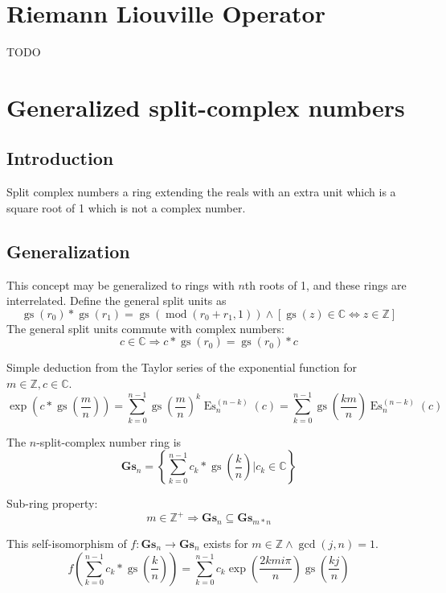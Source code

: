\documentclass[]{article}
\DeclareMathOperator{\es}{Es}
\DeclareMathOperator{\gs}{gs}
\DeclareMathOperator{\md}{mod}
\newcommand{\pqty}[1]{{\left(#1\right)}}
\newcommand{\Bqty}[1]{{\left\{#1\right\}}}
\newcommand{\bqty}[1]{{\left[#1\right]}}
\numberwithin{equation}{section}
\begin{document}
	\section{Riemann Liouville Operator}
	TODO
	
	\section{Generalized split-complex numbers}
	\subsection{Introduction}
	Split complex numbers a ring extending the reals with an extra unit which is a square root of 1 which is not a complex number.
	\subsection{Generalization}
	This concept may be generalized to rings with $n$th roots of 1, and these rings are interrelated. Define the general split units as
	\begin{equation}
	\gs\pqty{r_0}*\gs\pqty{r_1}=\gs\pqty{\md\pqty{r_0+r_1,1}}
	\land
	\bqty{\gs\pqty{z}\in\mathbb{C}\Leftrightarrow z\in\mathbb{Z}}
	\end{equation}
	The general split units commute with complex numbers:
	\begin{equation}
	c\in\mathbb{C}\Rightarrow c*\gs\pqty{r_0}=\gs\pqty{r_0}*c
	\end{equation}
	
	Simple deduction from the Taylor series of the exponential function for $m\in\mathbb{Z}, c\in\mathbb{C}$.
	\begin{equation}
	\exp\pqty{c*\gs\pqty{\frac{m}{n}}}=\sum_{k=0}^{n-1}\gs\pqty{\frac{m}{n}}^k \es_n^{(n-k)}\pqty{c}
	=\sum_{k=0}^{n-1}\gs\pqty{\frac{km}{n}} \es_n^{(n-k)}\pqty{c}
	\end{equation}
	
	The $n$-split-complex number ring is
	\begin{equation}
	\mathbf{Gs}_n=\Bqty{\sum_{k=0}^{n-1} c_k*\gs\pqty{\frac{k}{n}} \Bigg\vert c_k\in\mathbb{C}}
	\end{equation}
	
	Sub-ring property:
	\begin{equation}
	m\in\mathbb{Z}^+\Rightarrow\mathbf{Gs}_n\subseteq\mathbf{Gs}_{m*n}
	\end{equation}
	
	This self-isomorphism of $f:\mathbf{Gs}_n\rightarrow\mathbf{Gs}_n$ exists for $m\in\mathbb{Z}\land\gcd\pqty{j,n}=1$.
	\begin{equation}
	f\pqty{\sum_{k=0}^{n-1} c_k*\gs\pqty{\frac{k}{n}}}=\sum_{k=0}^{n-1} c_k\exp\pqty{\frac{2kmi\pi}{n}}\gs\pqty{\frac{kj}{n}}
	\end{equation}
	
\end{document}
